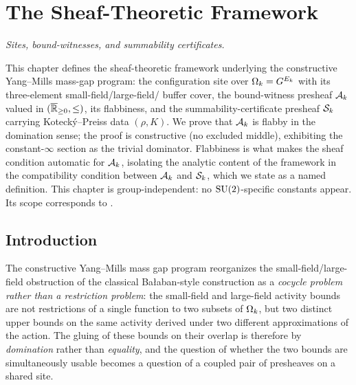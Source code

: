 %

\chapter{The Sheaf-Theoretic Framework}
\label{ch:sheaf-framework}

\noindent\emph{Sites, bound-witnesses, and summability certificates.}

This chapter defines the sheaf-theoretic framework underlying the
constructive Yang--Mills mass-gap program: the configuration site
over $\Omega_k = G^{E_k}$ with its three-element small-field/large-field/
buffer cover, the bound-witness presheaf $\mathcal{A}_k$ valued in
$(\overline{\mathbb{R}}_{\ge 0}, \le)$, its flabbiness, and the summability-certificate
presheaf $\mathcal{S}_k$ carrying Kotecký--Preiss data $(\rho, K)$.  We
prove that $\mathcal{A}_k$ is flabby in the domination sense; the proof
is constructive (no excluded middle), exhibiting the constant-$\infty$
section as the trivial dominator.  Flabbiness is what makes the sheaf
condition automatic for $\mathcal{A}_k$, isolating the analytic content of
the framework in the compatibility condition between $\mathcal{A}_k$ and
$\mathcal{S}_k$, which we state as a named definition.  This chapter is
group-independent: no $\mathrm{SU}(2)$-specific constants appear.  Its scope
corresponds to .

\section{Introduction}
\label{sec:sheaf-intro}

The constructive Yang--Mills mass gap program reorganizes the small-field/large-field obstruction of the classical Bałaban-style construction as a \emph{cocycle problem rather than a restriction problem}: the small-field and large-field activity bounds are not restrictions of a single function to two subsets of $\Omega_k$, but two distinct upper bounds on the same activity derived under two different approximations of the action.  The gluing of these bounds on their overlap is therefore by \emph{domination} rather than \emph{equality}, and the question of whether the two bounds are simultaneously usable becomes a question of a coupled pair of presheaves on a shared site.

